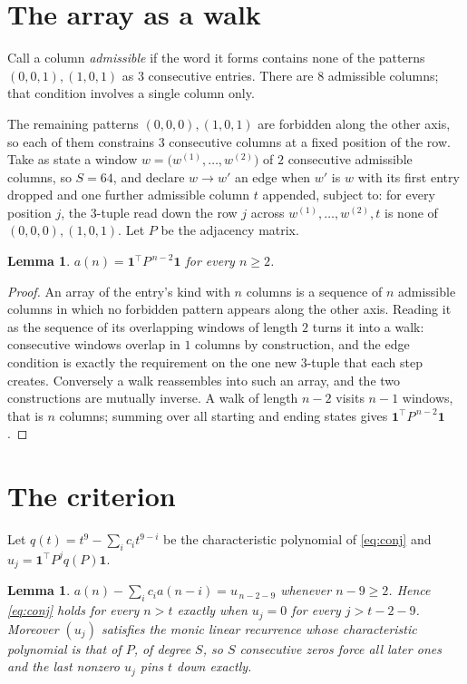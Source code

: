 \documentclass[11pt,a4paper]{article}
\theoremstyle{plain}
\newtheorem{lemma}[theorem]{Lemma}
\theoremstyle{definition}
\begin{document}
\section{The array as a walk}

Call a column \emph{admissible} if the word it forms contains none of the patterns
$(0,0,1), (1,0,1)$ as $3$ consecutive entries. There are $8$ admissible columns; that condition
involves a single column only.

The remaining patterns $(0,0,0), (1,0,1)$ are forbidden along the other axis, so each of them
constrains $3$ consecutive columns at a fixed position of the row. Take as state a
window $w=\bigl(w^{(1)},\dots,w^{(2)}\bigr)$ of $2$ consecutive admissible
columns, so $S=64$, and declare $w\to w'$ an edge when $w'$ is $w$ with its first entry
dropped and one further admissible column $t$ appended, subject to: for every position
$j$, the $3$-tuple read down the row $j$ across $w^{(1)},\dots,w^{(2)},t$
is none of $(0,0,0), (1,0,1)$. Let $P$ be the adjacency matrix.

\begin{lemma}\label{lem:walk}
$a(n)=\mathbf{1}^{\!\top}P^{\,n-2}\mathbf{1}$ for every $n\ge2$.
\end{lemma}

\begin{proof}
An array of the entry's kind with $n$ columns is a sequence of $n$ admissible columns in
which no forbidden pattern appears along the other axis. Reading it as the sequence of its
overlapping windows of length $2$ turns it into a walk: consecutive windows overlap in
$1$ columns by construction, and the edge condition is exactly the requirement on the one
new $3$-tuple that each step creates. Conversely a walk reassembles into such an array,
and the two constructions are mutually inverse. A walk of length $n-2$ visits $n-1$
windows, that is $n$ columns; summing over all starting and ending states gives
$\mathbf{1}^{\!\top}P^{\,n-2}\mathbf{1}$.
\end{proof}

\section{The criterion}

Let $q(t)=t^{9}-\sum_i c_i t^{9-i}$ be the characteristic polynomial of
\eqref{eq:conj} and $u_j=\mathbf{1}^{\!\top}P^{j}q(P)\mathbf{1}$.

\begin{lemma}\label{lem:crit}
$a(n)-\sum_i c_i a(n-i)=u_{\,n-2-9}$ whenever $n-9\ge2$. Hence
\eqref{eq:conj} holds for every $n>t$ exactly when $u_j=0$ for every
$j>t-2-9$. Moreover $(u_j)$ satisfies the monic linear recurrence whose
characteristic polynomial is that of $P$, of degree $S$, so $S$ consecutive zeros force all
later ones and the last nonzero $u_j$ pins $t$ down exactly.
\end{lemma}
\end{document}
